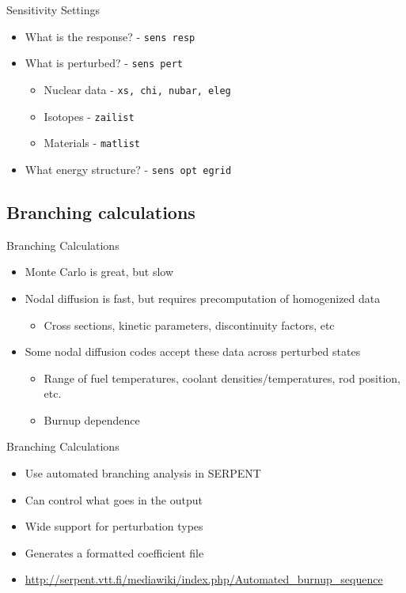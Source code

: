 \documentclass{beamer}
\begin{document}
\begin{frame}{Sensitivity Settings}
    \begin{itemize}
        \item{What is the response? - \texttt{sens resp}}
        \item{What is perturbed? - \texttt{sens pert}}
        \begin{itemize}
            \item{Nuclear data - \texttt{xs, chi, nubar, eleg}}
            \item{Isotopes - \texttt{zailist}}
            \item{Materials - \texttt{matlist}}
        \end{itemize}
        \item{What energy structure? - \texttt{sens opt egrid}}
    \end{itemize}
\end{frame}

\subsection{Branching calculations}

\begin{frame}{Branching Calculations}
    \begin{itemize}
        \item{Monte Carlo is great, but slow}
        \item{Nodal diffusion is fast, but requires precomputation of homogenized data}
        \begin{itemize}
            \item{Cross sections, kinetic parameters, discontinuity factors, etc}
        \end{itemize}
        \item{Some nodal diffusion codes accept these data across perturbed states}
        \begin{itemize}
            \item{Range of fuel temperatures, coolant densities/temperatures, rod position, etc.}
            \item{Burnup dependence}
        \end{itemize}
    \end{itemize}
\end{frame}

\begin{frame}{Branching Calculations}
    \begin{itemize}
        \item{Use automated branching analysis in SERPENT}
        \item{Can control what goes in the output}
        \item{Wide support for perturbation types}
        \item{Generates a formatted coefficient file}
        \item{\url{http://serpent.vtt.fi/mediawiki/index.php/Automated\_burnup\_sequence}}
    \end{itemize}
\end{frame}
\end{document}
